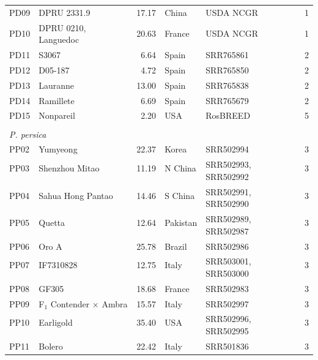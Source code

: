 \documentclass[12pt]{article}
\begin{document}
\begin{center}
\begin{longtable}{llrllc}
	PD09 &DPRU 2331.9 &17.17 &China &USDA NCGR &1\\
	PD10 &DPRU 0210, Languedoc &20.63 &France &USDA NCGR &1\\
	PD11 &S3067 &6.64 &Spain &SRR765861 &2\\
	PD12 &D05-187 &4.72 &Spain &SRR765850 &2\\
	PD13 &Lauranne &13.00 &Spain &SRR765838 &2\\
	PD14 &Ramillete &6.69 &Spain &SRR765679 &2\\
	PD15 &Nonpareil &2.20 & USA&RosBREED &5\\
	\\
	\multicolumn{6}{l}{\emph{P. persica}}  \\ %
	PP02 &Yumyeong &22.37 &Korea &SRR502994 &3\\
	PP03 &Shenzhou Mitao &11.19 &N China &
	\multirow{2}{1cm}{SRR502993, SRR502992} &3\\
	\\
	PP04 &Sahua Hong Pantao &14.46 &S China &
	\multirow{2}{1cm}{SRR502991, SRR502990} &3\\
	\\
	PP05 &Quetta &12.64 &Pakistan &
	\multirow{2}{1cm}{SRR502989, SRR502987} &3\\
	\\
	PP06 &Oro A &25.78 &Brazil &SRR502986 &3\\
	PP07 &IF7310828 &12.75 &Italy &
	\multirow{2}{2cm}{SRR503001, SRR503000} &3\\
	\\
	PP08 &GF305 &18.68 &France &SRR502983 &3\\
	PP09 &F$_{1}$ Contender $\times$ Ambra &15.57 &Italy &SRR502997 &3\\
	PP10 &Earligold &35.40 &USA &
	\multirow{2}{1cm}{SRR502996, SRR502995} &3\\
	\\
	PP11 &Bolero &22.42 &Italy &SRR501836 &3\\

\end{longtable}
\end{center}
\end{document}

